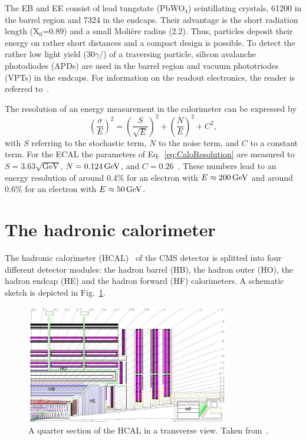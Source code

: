 The EB and EE consist of lead tungstate (PbWO$_4$) scintillating crystals, 61200 in the barrel region and 7324 in the endcaps. 
Their advantage is the short radiation length (X$_0$=0.89\cm) and a small Moli\`ere radius (2.2\cm).
Thus, particles deposit their energy on rather short distances and a compact design is possible.
To detect the rather low light yield (30$\gamma$/\mev) of a traversing particle, silicon avalanche photodiodes (APDs) are used in the barrel region and vacuum  phototriodes (VPTs) in the endcaps.
For information on the readout electronics, the reader is referred to~\cite{bib:CMS:TDR_2006}.

The resolution of an energy measurement in the calorimeter can be expressed by 
\begin{equation}
\label{eq:CaloResolution}
\left( \frac{\sigma}{E} \right)^2 = \left( \frac{S}{\sqrt{E}} \right)^2 + \left( \frac{N}{E} \right)^2 +C^2,
\end{equation}
with $S$ referring to the stochastic term, $N$ to the noise term, and $C$ to a constant term.
For the ECAL the parameters of Eq.~\eqref{eq:CaloResolution} are measured to $S=3.63\sqrt{\text{GeV}}$, $N=0.124\,\text{Ge}\kern-0.06667em\text{V}$, and $C=0.26$~\cite{bib:CMS:TDR_2006}. 
These numbers lead to an energy resolution of around 0.4\% for an electron with $E \approx 200\,\text{Ge}\kern-0.06667em\text{V}$ and around 0.6\% for an electron with $E \approx 50\,\text{Ge}\kern-0.06667em\text{V}$.

\section{The hadronic calorimeter}
The hadronic calorimeter (HCAL)~\cite{bib:CMS:TDR_2006,bib:CMS:TDR_HCAL} of the CMS detector is splitted into four different detector modules: the hadron barrel (HB), the hadron outer (HO), the hadron endcap (HE) and the hadron forward (HF) calorimeters.
A schematic sketch is depicted in Fig.~\ref{fig:HCAL}.
\begin{figure}[!ht]
  \centering
      \includegraphics[width=0.79\textwidth]{figures/experiment/CMS/fig_HCALdiagram.png}
  \caption{A quarter section of the HCAL in a transverse view. Taken from~\cite{bib:CMS:HCAL_Performance_2009}.}  
  \label{fig:HCAL}
\end{figure}

